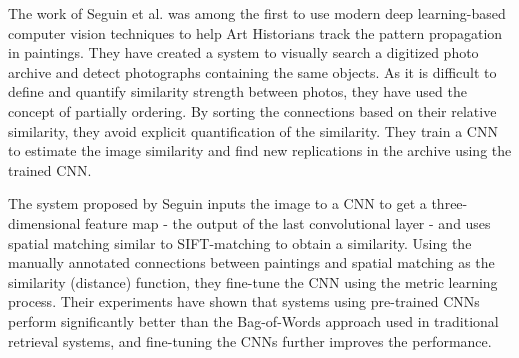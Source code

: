 The work of Seguin et al. \cite{seguin_2016} was among the first to use modern deep learning-based computer vision techniques to help Art Historians track the pattern propagation in paintings. They have created a system to visually search a digitized photo archive and detect photographs containing the same objects. As it is difficult to define and quantify similarity strength between photos, they have used the concept of partially ordering. By sorting the connections based on their relative similarity, they avoid explicit quantification of the similarity. They train a CNN to estimate the image similarity and find new replications in the archive using the trained CNN.

The system proposed by Seguin \cite{seguin_2016} inputs the image to a CNN to get a three-dimensional feature map - the output of the last convolutional layer - and uses spatial matching similar to SIFT-matching to obtain a similarity. Using the manually annotated connections between paintings and spatial matching as the similarity (distance) function, they fine-tune the CNN using the metric learning process. Their experiments have shown that systems using pre-trained CNNs perform significantly better than the Bag-of-Words approach used in traditional retrieval systems, and fine-tuning the CNNs further improves the performance.
